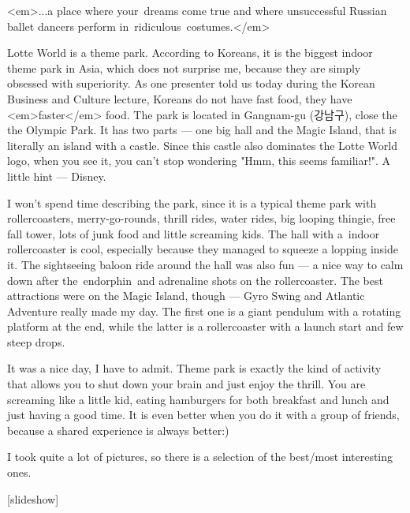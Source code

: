 \begin{post}
	\begin{content}
<em>...a place where your dreams come true and where unsuccessful Russian ballet dancers perform in ridiculous costumes.</em>



Lotte World is a theme park. According to Koreans, it is the biggest indoor theme park in Asia, which does not surprise me, because they are simply obsessed with superiority. As one presenter told us today during the Korean Business and Culture lecture, Koreans do not have fast food, they have <em>faster</em> food. The park is located in Gangnam-gu (강남구), close the the Olympic Park. It has two parts — one big hall and the Magic Island, that is literally an island with a castle. Since this castle also dominates the Lotte World logo, when you see it, you can't stop wondering "Hmm, this seems familiar!". A little hint — Disney.



I won't spend time describing the park, since it is a typical theme park with rollercoasters, merry-go-rounds, thrill rides, water rides, big looping thingie, free fall tower, lots of junk food and little screaming kids. The hall with a indoor rollercoaster is cool, especially because they managed to squeeze a lopping inside it. The sightseeing baloon ride around the hall was also fun — a nice way to calm down after the endorphin and adrenaline shots on the rollercoaster. The best attractions were on the Magic Island, though — Gyro Swing and Atlantic Adventure really made my day. The first one is a giant pendulum with a rotating platform at the end, while the latter is a rollercoaster with a launch start and few steep drops.



It was a nice day, I have to admit. Theme park is exactly the kind of activity that allows you to shut down your brain and just enjoy the thrill. You are screaming like a little kid, eating hamburgers for both breakfast and lunch and just having a good time. It is even better when you do it with a group of friends, because a shared experience is always better:)



I took quite a lot of pictures, so there is a selection of the best/most interesting ones.



[slideshow]




\end{content}
\end{post}
